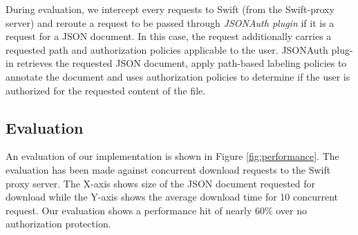  During evaluation, we intercept every requests to Swift (from the Swift-proxy server) and reroute a request to be passed through \textit{JSONAuth plugin} if it is a request for a JSON document. In this case, the request additionally carries a requested path and authorization policies applicable to the user. JSONAuth plug-in retrieves the requested JSON document, apply path-based labeling policies to annotate the document and uses authorization policies to determine if the user is authorized for the requested content of the file. 

\subsection{Evaluation}



An evaluation of our implementation is shown in Figure \ref{fig:performance}. The evaluation has been made against concurrent download requests to the Swift proxy server. The X-axis shows size of the JSON document requested for download while the Y-axis shows the average download time for 10 concurrent request. Our evaluation shows a performance hit of nearly 60\% over no authorization protection.


